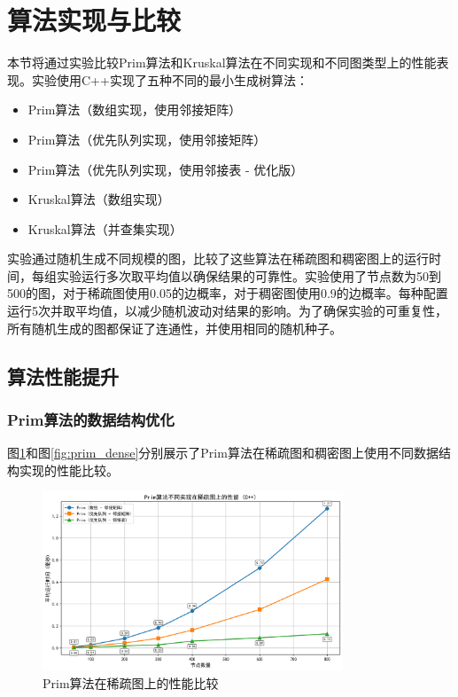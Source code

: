 \documentclass[a4paper,12pt]{ctexart}
\begin{document}
\section{算法实现与比较}
本节将通过实验比较Prim算法和Kruskal算法在不同实现和不同图类型上的性能表现。实验使用C++实现了五种不同的最小生成树算法：
\begin{itemize}
    \item Prim算法（数组实现，使用邻接矩阵）
    \item Prim算法（优先队列实现，使用邻接矩阵）
    \item Prim算法（优先队列实现，使用邻接表 - 优化版）
    \item Kruskal算法（数组实现）
    \item Kruskal算法（并查集实现）
\end{itemize}

实验通过随机生成不同规模的图，比较了这些算法在稀疏图和稠密图上的运行时间，每组实验运行多次取平均值以确保结果的可靠性。实验使用了节点数为50到500的图，对于稀疏图使用0.05的边概率，对于稠密图使用0.9的边概率。每种配置运行5次并取平均值，以减少随机波动对结果的影响。为了确保实验的可重复性，所有随机生成的图都保证了连通性，并使用相同的随机种子。

\subsection{算法性能提升}
\subsubsection{Prim算法的数据结构优化}
图\ref{fig:prim_sparse}和图\ref{fig:prim_dense}分别展示了Prim算法在稀疏图和稠密图上使用不同数据结构实现的性能比较。

\begin{figure}[htbp]
    \centering
    \includegraphics[width=0.8\textwidth]{img/img_cpp2/prim_sparse_comparison_cpp.png}
    \caption{Prim算法在稀疏图上的性能比较}
    \label{fig:prim_sparse}
\end{figure}
\end{document}
